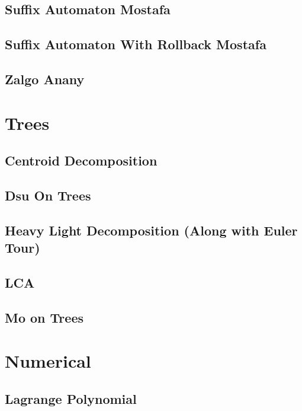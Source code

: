 \subsection{Suffix Automaton Mostafa}
\raggedbottom
\hrulefill
\subsection{Suffix Automaton With Rollback Mostafa}
\raggedbottom
\hrulefill
\subsection{Zalgo Anany}
\raggedbottom
\hrulefill

\section{Trees}
\subsection{Centroid Decomposition}
\raggedbottom
\hrulefill
\subsection{Dsu On Trees}
\raggedbottom
\hrulefill
\subsection{Heavy Light Decomposition (Along with Euler Tour)}
\raggedbottom
\hrulefill
\subsection{LCA}
\raggedbottom
\hrulefill
\subsection{Mo on Trees}
\raggedbottom
\hrulefill

\section{Numerical}
\subsection{Lagrange Polynomial}
\raggedbottom
\hrulefill

